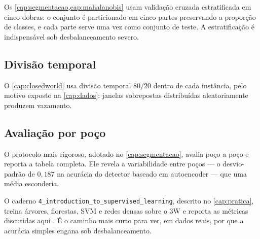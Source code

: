 Os \cref{cap:segmentacao,cap:mahalanobis} usam validação cruzada estratificada em cinco
dobras: o conjunto é particionado em cinco partes preservando a proporção de classes,
e cada parte serve uma vez como conjunto de teste. A estratificação é indispensável
sob desbalanceamento severo.

\subsection{Divisão temporal}

O \cref{cap:closedworld} usa divisão temporal $80/20$ dentro de cada instância, pelo
motivo exposto na \cref{cap:dados}: janelas sobrepostas distribuídas aleatoriamente
produzem vazamento.

\subsection{Avaliação por poço}

O protocolo mais rigoroso, adotado no \cref{cap:segmentacao}, avalia poço a poço e
reporta a tabela completa. Ele revela a variabilidade entre poços --- o desvio-padrão
de $0{,}187$ na acurácia do detector baseado em autoencoder --- que uma média
esconderia.

\begin{destaque}[Prática]
O caderno \texttt{4\_introduction\_to\_supervised\_learning}, descrito no
\cref{cap:pratica}, treina árvores, florestas, SVM e redes densas sobre o 3W e reporta as
métricas discutidas aqui \citep{Lopes2026Intro3W}. É o caminho mais curto para ver, em
dados reais, por que a acurácia simples engana sob desbalanceamento.
\end{destaque}


